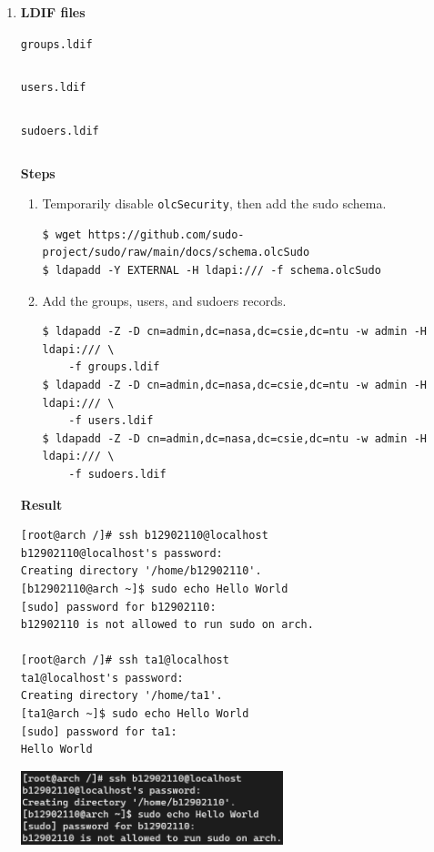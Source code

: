\documentclass[12pt, a4paper]{article}
\begin{document}
\begin{enumerate}[label=(\alph*)]
    \pagebreak
    \item \textbf{LDIF files}

    \verb|groups.ldif|
    \inputminted[fontsize=\footnotesize]{ldif}{ldif/groups.ldif}

    \verb|users.ldif|
    \inputminted[fontsize=\footnotesize]{ldif}{ldif/users.ldif}

    \verb|sudoers.ldif|
    \inputminted[fontsize=\footnotesize]{ldif}{ldif/sudoers.ldif}

    \textbf{Steps}
    \begin{enumerate}[label=(\arabic*)]
      \item Temporarily disable \verb|olcSecurity|, then add the sudo schema.
      \begin{Verbatim}[frame=single, fontsize=\footnotesize]
$ wget https://github.com/sudo-project/sudo/raw/main/docs/schema.olcSudo
$ ldapadd -Y EXTERNAL -H ldapi:/// -f schema.olcSudo
      \end{Verbatim}
      \item Add the groups, users, and sudoers records.
      \begin{Verbatim}[frame=single, fontsize=\footnotesize]
$ ldapadd -Z -D cn=admin,dc=nasa,dc=csie,dc=ntu -w admin -H ldapi:/// \
    -f groups.ldif
$ ldapadd -Z -D cn=admin,dc=nasa,dc=csie,dc=ntu -w admin -H ldapi:/// \
    -f users.ldif
$ ldapadd -Z -D cn=admin,dc=nasa,dc=csie,dc=ntu -w admin -H ldapi:/// \
    -f sudoers.ldif
      \end{Verbatim}
    \end{enumerate}

    \textbf{Result}
    \begin{Verbatim}[frame=single]
[root@arch /]# ssh b12902110@localhost
b12902110@localhost's password:
Creating directory '/home/b12902110'.
[b12902110@arch ~]$ sudo echo Hello World
[sudo] password for b12902110:
b12902110 is not allowed to run sudo on arch.

[root@arch /]# ssh ta1@localhost
ta1@localhost's password:
Creating directory '/home/ta1'.
[ta1@arch ~]$ sudo echo Hello World
[sudo] password for ta1:
Hello World
    \end{Verbatim}

    \includegraphics[width=0.6\textwidth]{2-d_b12902110.png}


\end{enumerate}
\end{document}
